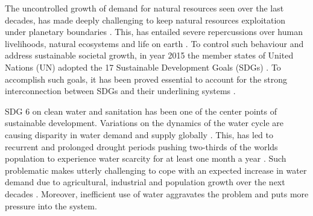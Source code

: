 The uncontrolled growth of demand for natural resources seen over the last decades, has made deeply challenging to keep natural resources exploitation under planetary boundaries \cite{planetaryBoundaries2009}. This, has entailed severe repercussions over human livelihoods, natural ecosystems and life on earth \cite{planetaryBoundaries2009,Steffen1259855}. To control such behaviour and address sustainable societal growth, in year 2015 the member states of United Nations (UN) adopted the 17 Sustainable Development Goals (SDGs) \cite{rosaTransformingOurWorld2017}. To accomplish such goals, it has been proved essential to account for the strong interconnection between SDGs and their underlining systems \cite{WaterSanitationInterlinkages2016,fusoneriniMappingSynergiesTradeoffs2018,fusoneriniConnectingClimateAction2019}. 

SDG 6 on clean water and sanitation has been one of the center points of sustainable development. Variations on the dynamics of the water cycle are causing disparity in water demand and supply globally \cite{FAO2015,unescoWastewaterUntappedResource2017}. This, has led to recurrent and prolonged drought periods pushing two-thirds of the worlds population to experience water scarcity for at least one month a year \cite{Mekonnene1500323}. Such problematic makes utterly challenging to cope with an expected increase in water demand due to agricultural, industrial and population growth over the next decades \cite{IFPRI2017}. Moreover, inefficient use of water aggravates the problem and puts more pressure into the system.

